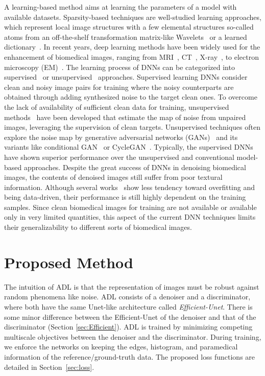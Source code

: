 \documentclass[journal,twoside,web]{ieeecolor}
\begin{document}
A learning-based method aims at learning the parameters of a model with available datasets. Sparsity-based techniques are well-studied learning approaches, which represent local image structures with a few elemental structures so-called atoms from an off-the-shelf transformation matrix-like Wavelets~\cite{guleryuz2007weighted} or a learned dictionary~\cite{xu2012low,rai2021unsupervised}. 
In recent years, deep learning methods have been widely used for the enhancement of biomedical images, ranging from 
MRI~\cite{liu2018applications,stimpel2019multi}, CT~\cite{yang2018low,wu2020self}, X-ray~\cite{gondara2016medical}, to electron microscopy (EM)~\cite{quan2019removing,lee2021iscl}. 
The learning process of DNNs can be categorized into supervised~\cite{zhang2017beyond,sharif2020learning,liang2021swinir} or unsupervised~\cite{zhu2017unpaired,bera2021noise,lee2021iscl} approaches. 
Supervised learning DNNs consider clean and noisy image pairs for training where the noisy counterparts are obtained through adding synthesized noise to the target clean ones. 
To overcome the lack of availability of sufficient clean data for training, unsupervised methods~\cite{zhu2017unpaired,huang2020noise,lee2021iscl} have been developed that estimate the map of noise from unpaired images, leveraging the supervision of clean targets. 
Unsupervised techniques often explore the noise map by generative adversarial networks (GANs)~\cite{goodfellow2014generative} and its variants like conditional GAN~\cite{mirza2014conditional} or CycleGAN~\cite{zhu2017unpaired}. Typically, the supervised DNNs have shown superior performance over the unsupervised and conventional model-based approaches. 
Despite the great success of DNNs in denoising biomedical images, the contents of denoised images still suffer from poor textural information. 
Although several works~\cite{liang2021swinir,sharif2020learning} show less tendency toward overfitting and being data-driven, their performance is still highly dependent on the training samples. Since clean biomedical images for training are not available or available only in very limited quantities, this aspect of the current DNN techniques limits their generalizability to different sorts of biomedical images. 
\section{Proposed Method}\label{sec:proposed_preafce}
The intuition of ADL is that the representation of images must be robust against random phenomena like noise. ADL consists of a denoiser and a discriminator, where both have the same Unet-like architecture called \textit{Efficient-Unet}. There is some minor difference between the Efficient-Unet of the denoiser and that of the discriminator (Section \ref{sec:Efficient}). 
ADL is trained by minimizing competing multiscale objectives between the denoiser and the discriminator. During training, we enforce the networks on keeping the edges, histogram, and paramedical information of the reference/ground-truth data. The proposed loss functions are detailed in Section~\ref{sec:loss}.
\end{document}
